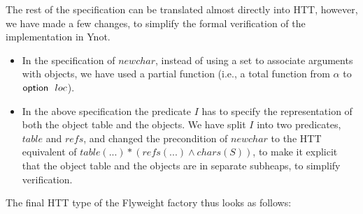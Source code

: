 The rest of the specification can be translated almost directly into HTT,
however, we have made a few changes, to simplify the formal verification of the
implementation in Ynot. 
\begin{itemize}
\item In the specification of $newchar$, instead of using a set to associate
arguments with objects, we have used a partial function (i.e., a total
function from $\alpha$ to $\mbox{\textsf{{option }}}{\ }loc$).
\item In the above specification the predicate $I$ has to specify the
representation of both the object table and the objects. We have
split $I$ into two predicates, $table$ and $refs$, and changed the precondition
of $newchar$ to the HTT equivalent of $table(...) * (refs(...) \land
chars(S))$, to make it explicit that the object table and the objects
are in separate subheaps, to simplify verification.
\end{itemize}
The final HTT type of the Flyweight factory thus looks as follows:
